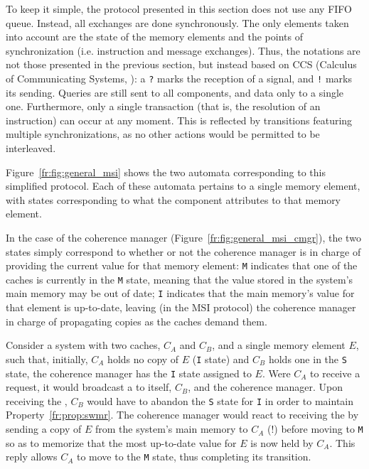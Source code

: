 To keep it simple, the protocol presented in this section does not use any FIFO
queue. Instead, all exchanges are done synchronously. The only elements taken
into account are the state of the memory elements and the points of
synchronization (i.e. instruction and message exchanges). Thus, the notations
are not those presented in the previous section, but instead based on CCS
(Calculus of Communicating Systems, \cite{10.5555/539036}): a \texttt{?} marks
the reception of a signal, and \texttt{!} marks its sending.  Queries are still
sent to all components, and data only to a single one.  Furthermore, only a
single transaction (that is, the resolution of an instruction) can occur at any
moment. This is reflected by transitions featuring multiple synchronizations,
as no other actions would be permitted to be interleaved.

Figure~\ref{fr:fig:general_msi} shows the two automata corresponding to this
simplified protocol. Each of these automata pertains to a single memory element,
with states corresponding to what the component attributes to that memory
element.

In the case of the coherence manager (Figure~\ref{fr:fig:general_msi_cmgr}), the
two states simply correspond to whether or not the coherence manager is in
charge of providing the current value for that memory element: \texttt{M}
indicates that one of the caches is currently in the \texttt{M} state, meaning
that the value stored in the system's main memory may be out of date; \texttt{I}
indicates that the main memory's value for that element is up-to-date, leaving
(in the MSI protocol) the coherence manager in charge of propagating copies
as the caches demand them.

\begin{example}%
\label{fr:ex:general_msi_single_store}
Consider a system with two caches, $C_A$ and $C_B$, and a single memory
element $E$, such that, initially, $C_A$ holds no copy of $E$ (\texttt{I}
state) and $C_B$ holds one in the \texttt{S} state, the coherence manager
has the \texttt{I} state assigned to $E$. Were $C_A$ to receive a \storeinstr{}
request, it would broadcast a \getmquery{} to itself, $C_B$, and the coherence
manager. Upon receiving the \getmquery{}, $C_B$ would have to abandon the
\texttt{S} state for \texttt{I} in order to maintain Property~\ref{fr:prop:swmr}.
The coherence manager would react to receiving the \getmquery{} by sending a
copy of $E$ from the system's main memory to $C_A$ (\simpledata!)
before moving to \texttt{M} so as to memorize that the most up-to-date value
for $E$ is now held by $C_A$. This \simpledata{} reply allows $C_A$ to move to
the \texttt{M} state, thus completing its transition.
\end{example}

